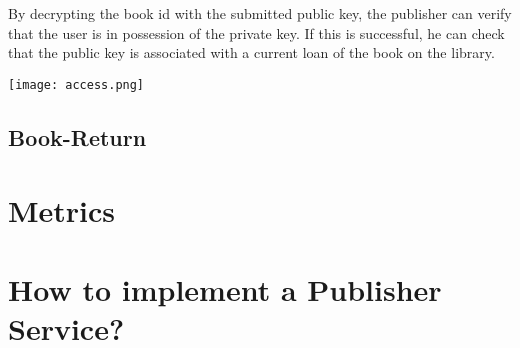 By decrypting the book id with the submitted public key, the publisher can verify that the user is in possession of the private key. If this is successful, he can check that the public key is associated with a current loan of the book on the library. 


\vspace{0.3cm}
\texttt{[image: access.png]}


\subsection{Book-Return}

\section{Metrics}

\section{How to implement a Publisher Service?}

